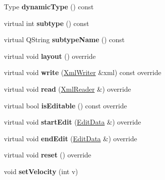 \begin{DoxyCompactItemize}
Type {\bfseries dynamic\+Type} () const
\item 
\mbox{\label{class_ms_1_1_dynamic_a0964b0040f8be417070c7c2c165933d7}} 
virtual int {\bfseries subtype} () const
\item 
\mbox{\label{class_ms_1_1_dynamic_aa1ea95505ee0a7697d20011332e2acba}} 
virtual Q\+String {\bfseries subtype\+Name} () const
\item 
\mbox{\label{class_ms_1_1_dynamic_ae87cc1992bd580193735cf22e05fdeea}} 
virtual void {\bfseries layout} () override
\item 
\mbox{\label{class_ms_1_1_dynamic_a4e42c5c5027ad0c636ad35536decf46f}} 
virtual void {\bfseries write} (\hyperlink{class_ms_1_1_xml_writer}{Xml\+Writer} \&xml) const override
\item 
\mbox{\label{class_ms_1_1_dynamic_a01b73d9c8e9640b91e315c96c3bb0f28}} 
virtual void {\bfseries read} (\hyperlink{class_ms_1_1_xml_reader}{Xml\+Reader} \&) override
\item 
\mbox{\label{class_ms_1_1_dynamic_a2bb7746faf50dab45734d51eebb960c0}} 
virtual bool {\bfseries is\+Editable} () const override
\item 
\mbox{\label{class_ms_1_1_dynamic_a59e5b5c316f999d71ed547f11ae7b995}} 
virtual void {\bfseries start\+Edit} (\hyperlink{class_ms_1_1_edit_data}{Edit\+Data} \&) override
\item 
\mbox{\label{class_ms_1_1_dynamic_aed8030e47c65fd552bb0eb3fcd134ae3}} 
virtual void {\bfseries end\+Edit} (\hyperlink{class_ms_1_1_edit_data}{Edit\+Data} \&) override
\item 
\mbox{\label{class_ms_1_1_dynamic_a61238a9f58ae06d87f2e59392ccf2791}} 
virtual void {\bfseries reset} () override
\item 
\mbox{\label{class_ms_1_1_dynamic_a4639dc7984227cff3329f1ab05f56337}} 
void {\bfseries set\+Velocity} (int v)
\item 

\end{DoxyCompactItemize}
